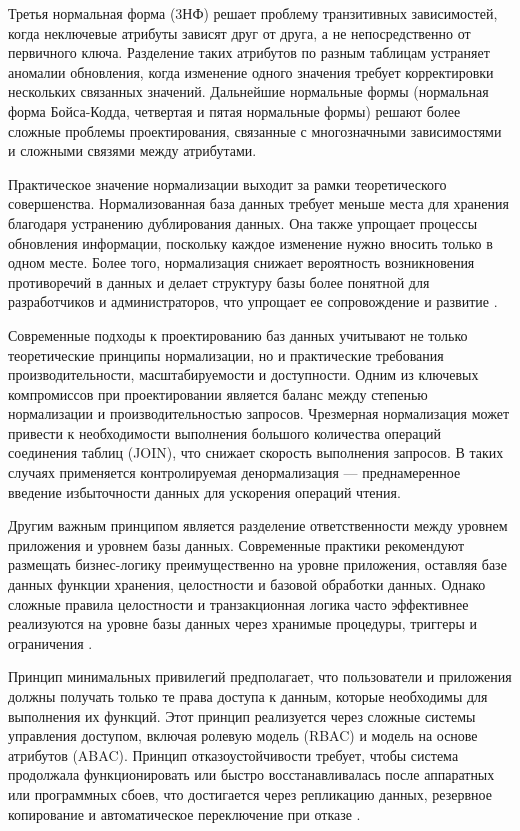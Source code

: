 \documentclass{SibFU-docs}
\begin{document}
Третья нормальная форма (3НФ) решает проблему транзитивных зависимостей, когда неключевые атрибуты зависят друг от друга, а не непосредственно от первичного ключа. Разделение таких атрибутов по разным таблицам устраняет аномалии обновления, когда изменение одного значения требует корректировки нескольких связанных значений. Дальнейшие нормальные формы (нормальная форма Бойса-Кодда, четвертая и пятая нормальные формы) решают более сложные проблемы проектирования, связанные с многозначными зависимостями и сложными связями между атрибутами.

Практическое значение нормализации выходит за рамки теоретического совершенства. Нормализованная база данных требует меньше места для хранения благодаря устранению дублирования данных. Она также упрощает процессы обновления информации, поскольку каждое изменение нужно вносить только в одном месте. Более того, нормализация снижает вероятность возникновения противоречий в данных и делает структуру базы более понятной для разработчиков и администраторов, что упрощает ее сопровождение и развитие \cite{date2003}.


Современные подходы к проектированию баз данных учитывают не только теоретические принципы нормализации, но и практические требования производительности, масштабируемости и доступности. Одним из ключевых компромиссов при проектировании является баланс между степенью нормализации и производительностью запросов. Чрезмерная нормализация может привести к необходимости выполнения большого количества операций соединения таблиц (JOIN), что снижает скорость выполнения запросов. В таких случаях применяется контролируемая денормализация — преднамеренное введение избыточности данных для ускорения операций чтения.

Другим важным принципом является разделение ответственности между уровнем приложения и уровнем базы данных. Современные практики рекомендуют размещать бизнес-логику преимущественно на уровне приложения, оставляя базе данных функции хранения, целостности и базовой обработки данных. Однако сложные правила целостности и транзакционная логика часто эффективнее реализуются на уровне базы данных через хранимые процедуры, триггеры и ограничения \cite{elmasri2016}.

Принцип минимальных привилегий предполагает, что пользователи и приложения должны получать только те права доступа к данным, которые необходимы для выполнения их функций. Этот принцип реализуется через сложные системы управления доступом, включая ролевую модель (RBAC) и модель на основе атрибутов (ABAC). Принцип отказоустойчивости требует, чтобы система продолжала функционировать или быстро восстанавливалась после аппаратных или программных сбоев, что достигается через репликацию данных, резервное копирование и автоматическое переключение при отказе \cite{gray1993}.
\end{document}
